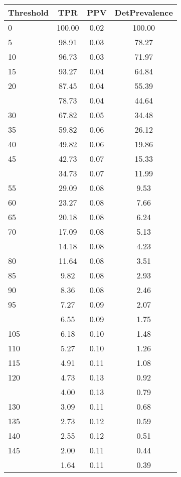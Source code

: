 \begin{table}[ht]
\centering
\begin{tabular}{lccc}
  \toprule
Threshold & TPR & PPV & DetPrevalence \\ 
  \midrule
0 & 100.00 & 0.02 & 100.00 \\ 
  5 & 98.91 & 0.03 & 78.27 \\ 
  10 & 96.73 & 0.03 & 71.97 \\ 
  15 & 93.27 & 0.04 & 64.84 \\ 
  20 & 87.45 & 0.04 & 55.39 \\ 
   \addlinespace
25 & 78.73 & 0.04 & 44.64 \\ 
  30 & 67.82 & 0.05 & 34.48 \\ 
  35 & 59.82 & 0.06 & 26.12 \\ 
  40 & 49.82 & 0.06 & 19.86 \\ 
  45 & 42.73 & 0.07 & 15.33 \\ 
   \addlinespace
50 & 34.73 & 0.07 & 11.99 \\ 
  55 & 29.09 & 0.08 & 9.53 \\ 
  60 & 23.27 & 0.08 & 7.66 \\ 
  65 & 20.18 & 0.08 & 6.24 \\ 
  70 & 17.09 & 0.08 & 5.13 \\ 
   \addlinespace
75 & 14.18 & 0.08 & 4.23 \\ 
  80 & 11.64 & 0.08 & 3.51 \\ 
  85 & 9.82 & 0.08 & 2.93 \\ 
  90 & 8.36 & 0.08 & 2.46 \\ 
  95 & 7.27 & 0.09 & 2.07 \\ 
   \addlinespace
100 & 6.55 & 0.09 & 1.75 \\ 
  105 & 6.18 & 0.10 & 1.48 \\ 
  110 & 5.27 & 0.10 & 1.26 \\ 
  115 & 4.91 & 0.11 & 1.08 \\ 
  120 & 4.73 & 0.13 & 0.92 \\ 
   \addlinespace
125 & 4.00 & 0.13 & 0.79 \\ 
  130 & 3.09 & 0.11 & 0.68 \\ 
  135 & 2.73 & 0.12 & 0.59 \\ 
  140 & 2.55 & 0.12 & 0.51 \\ 
  145 & 2.00 & 0.11 & 0.44 \\ 
   \addlinespace
150 & 1.64 & 0.11 & 0.39 \\ 

\end{tabular}
\end{table}
